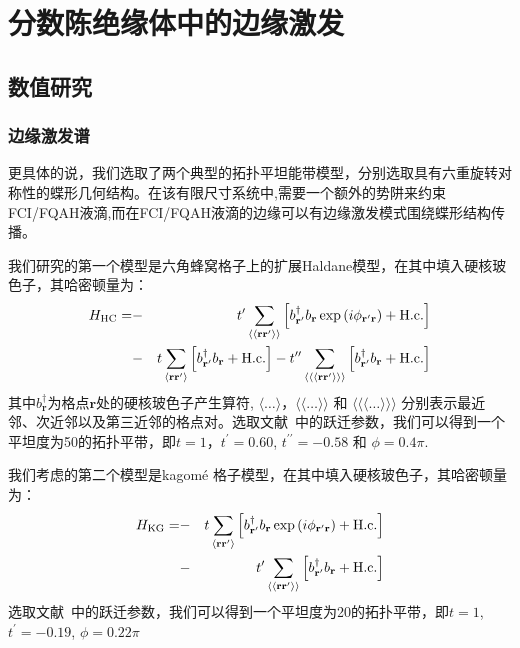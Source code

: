 \chapter{分数陈绝缘体中的边缘激发}
\label{FCIedge}

\section{数值研究}
\subsection{边缘激发谱}
更具体的说，我们选取了两个典型的拓扑平坦能带模型，分别选取具有六重旋转对称性的蝶形几何结构。在该有限尺寸系统中,需要一个额外的势阱来约束FCI/FQAH液滴,而在FCI/FQAH液滴的边缘可以有边缘激发模式围绕蝶形结构传播。

我们研究的第一个模型是六角蜂窝格子上的扩展Haldane模型，在其中填入硬核玻色子，其哈密顿量为：
\begin{eqnarray}
H_{\rm HC}= &-&t^{\prime}\sum_{\langle\langle\mathbf{r}\mathbf{r}^{
\prime}\rangle\rangle}
\left[b^{\dagger}_{\mathbf{r}^{ \prime}}b_{\mathbf{r}}\exp\left(i\phi_{\mathbf{r}^{ \prime}\mathbf{r}}\right)+\textrm{H.c.}\right]\\
&-&t\sum_{\langle\mathbf{r}\mathbf{r}^{ \prime}\rangle}
\left[b^{\dagger}_{\mathbf{r}^{\prime}}b_{\mathbf{r}}+\textrm{H.c.}\right]
-t^{\prime\prime}\sum_{\langle\langle\langle\mathbf{r}\mathbf{r}^{
\prime}\rangle\rangle\rangle}
\left[b^{\dagger}_{\mathbf{r}^{\prime}}b_{\mathbf{r}}+\textrm{H.c.}\right]\nonumber
\label{eq:HC}
\end{eqnarray}
其中$b^{\dagger}_{\mathbf{r}}$为格点$\mathbf{r}$处的硬核玻色子产生算符,  $\langle\dots\rangle$，$\langle\langle\dots\rangle\rangle$ 和 $\langle\langle\langle\dots\rangle\rangle\rangle$ 分别表示最近邻、次近邻以及第三近邻的格点对。选取文献~\cite{YFWang1}中的跃迁参数，我们可以得到一个平坦度为50的拓扑平带，即$t=1$，$t^{\prime}=0.60$, $t^{\prime\prime}=-0.58$ 和 $\phi=0.4\pi$.

我们考虑的第二个模型是kagom\'{e} 格子模型，在其中填入硬核玻色子，其哈密顿量为：
\begin{eqnarray}
H_{\rm KG}= &-&t\sum_{\langle\mathbf{r}\mathbf{r}^{ \prime}\rangle}
\left[b^{\dagger}_{\mathbf{r}^{ \prime}}b_{\mathbf{r}}\exp\left(i\phi_{\mathbf{r}^{ \prime}\mathbf{r}}\right)+\textrm{H.c.}\right]\nonumber\\
&-&t^{\prime}\sum_{\langle\langle\mathbf{r}\mathbf{r}^{\prime}\rangle\rangle}
\left[b^{\dagger}_{\mathbf{r}^{\prime}}b_{\mathbf{r}}+\textrm{H.c.}\right]%
\label{eq:KG}
\end{eqnarray}
选取文献~\cite{RLiu}中的跃迁参数，我们可以得到一个平坦度为20的拓扑平带，即$t=1$, $t^{\prime}=-0.19$, $\phi=0.22\pi$

